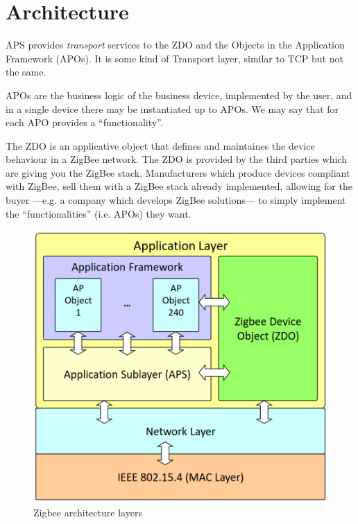 \section{Architecture}

\begin{paracol}{2}
   
   
   APS provides \textit{transport} services to the ZDO and the Objects in the Application Framework (APOs). It is some kind of Transport layer, similar to TCP but not the same.
   
   APOs are the business logic of the business device, implemented by the user, and in a single device there may be instantiated up to APOs.
   We may say that for each APO provides a ``functionality''.
   
   The ZDO is an applicative object that defines and maintaines the device behaviour in a ZigBee network.
   {\ns{}}
   The ZDO is provided by the third parties which are giving you the ZigBee stack.
   Manufacturers which produce devices compliant with ZigBee, sell them with a ZigBee stack already implemented, allowing for the buyer ---e.g. a company which develops ZigBee solutions--- to simply implement the ``functionalities'' (i.e. APOs) they want.
   \switchcolumn

   \colfill
   \begin{figure}[htbp]
      \centering
      \includegraphics{images/zigbee_architecture.png}
      \caption{Zigbee architecture layers}
      \label{fig:zigbee_architecture}
   \end{figure}
   \colfill
\end{paracol}

